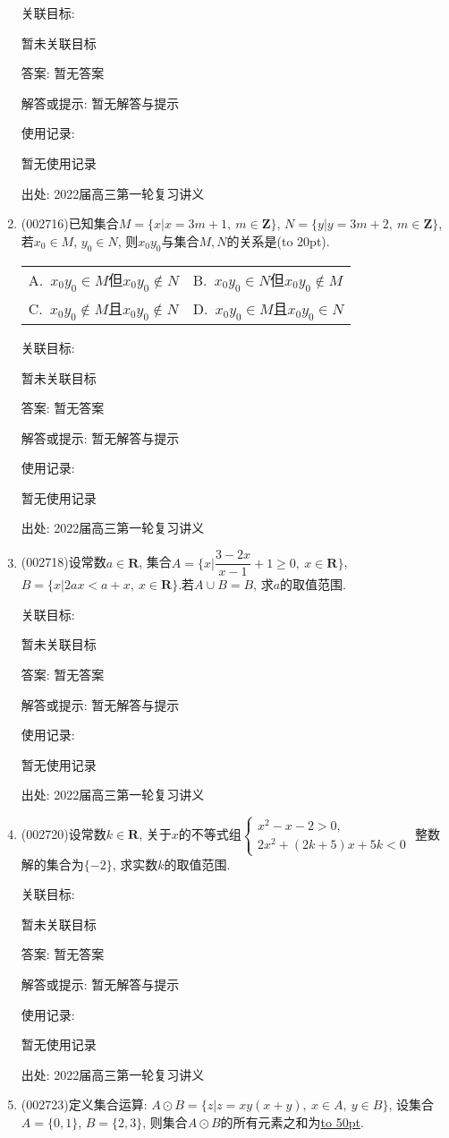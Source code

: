 \documentclass[10pt,a4paper]{article}
\newcommand{\blank}[1]{\underline{\hbox to #1pt{}}}
\newcommand{\bracket}[1]{(\hbox to #1pt{})}
\newcommand{\twoch}[4]{\par\begin{tabular}{p{.46\textwidth}p{.46\textwidth}}
A.~#1& B.~#2\\
C.~#3& D.~#4
\end{tabular}}
\begin{document}
\begin{enumerate}[1.]
关联目标:

暂未关联目标

答案: 暂无答案

解答或提示: 暂无解答与提示

使用记录:

暂无使用记录


出处: 2022届高三第一轮复习讲义
\item { (002716)}已知集合$M=\{x|x=3m+1, \ m\in \mathbf{Z}\}$, $N=\{y|y=3m+2, \ m\in \mathbf{Z}\}$, 若$x_0\in M$, $y_0\in N$, 则$x_0y_0$与集合$M,N$的关系是\bracket{20}.
\twoch{$x_0y_0\in M$但$x_0y_0$$\notin N$}{$x_0y_0\in N$但$x_0y_0\notin M$}{$x_0y_0\notin M$且$x_0y_0\notin N$}{$x_0y_0$$\in M$且$x_0y_0\in N$}


关联目标:

暂未关联目标

答案: 暂无答案

解答或提示: 暂无解答与提示

使用记录:

暂无使用记录


出处: 2022届高三第一轮复习讲义
\item { (002718)}设常数$a\in \mathbf{R}$, 集合$A=\{x|\dfrac{3-2x}{x-1}+1 \ge 0, \ x\in \mathbf{R}\}$, $B=\{x|2ax<a+x, \ x\in \mathbf{R} \}$.若$A\cup B=B$, 求$a$的取值范围.


关联目标:

暂未关联目标

答案: 暂无答案

解答或提示: 暂无解答与提示

使用记录:

暂无使用记录


出处: 2022届高三第一轮复习讲义
\item { (002720)}设常数$k\in \mathbf{R}$, 关于$x$的不等式组$\begin{cases} x^2-x-2>0, \\ 2x^2+(2k+5)x+5k<0 \end{cases}$ 整数解的集合为$\{-2\}$, 求实数$k$的取值范围.


关联目标:

暂未关联目标

答案: 暂无答案

解答或提示: 暂无解答与提示

使用记录:

暂无使用记录


出处: 2022届高三第一轮复习讲义
\item { (002723)}定义集合运算: $A\odot B=\{z|z=xy(x+y), \ x\in A, \ y\in B \}$, 设集合$A=\{0,1\}$, $B=\{2,3\}$, 则集合$A\odot B$的所有元素之和为\blank{50}.



\end{enumerate}
\end{document}
